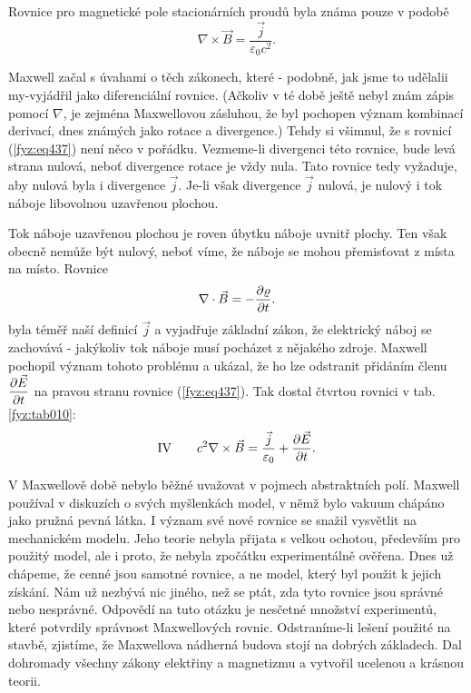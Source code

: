   Rovnice pro magnetické pole stacionárních proudů byla známa pouze v podobě
  \begin{equation}\label{fyz:eq437}
    \nabla\times\vec{B} = \dfrac{\vec{j}}{\varepsilon_0c^2}.
  \end{equation}
  
  Maxwell začal s úvahami o těch zákonech, které - podobně, jak jsme to udělalii my-vyjádřil jako 
  diferenciální rovnice. (Ačkoliv v té době ještě nebyl znám zápis pomocí \(\nabla\), je zejména 
  Maxwellovou zásluhou, že byl pochopen význam kombinací derivací, dnes známých jako rotace a 
  divergence.) Tehdy si všimnul, že s rovnicí (\ref{fyz:eq437}) není něco v pořádku. Vezmeme-li 
  divergenci této rovnice, bude levá strana nulová, neboť divergence rotace je vždy nula. Tato 
  rovnice tedy vyžaduje, aby nulová byla i divergence \(\vec{j}\). Je-li však divergence 
  \(\vec{j}\) nulová, je nulový i tok náboje libovolnou uzavřenou plochou. 
  
  Tok náboje uzavřenou plochou je roven úbytku náboje uvnitř plochy. Ten však obecně nemůže být 
  nulový, neboť víme, že náboje se mohou přemisťovat z místa na místo. Rovnice
  \begin{equation}\label{fyz:eq438}
    \nabla\cdot\vec{B} = -\dfrac{\partial \varrho}{\partial t}.
  \end{equation}
  byla téměř naší definicí \(\vec{j}\) a vyjadřuje základní zákon, že elektrický náboj se zachovává 
  - jakýkoliv tok náboje musí pocházet z nějakého zdroje. Maxwell pochopil význam tohoto problému a 
  ukázal, že ho lze odstranit přidáním členu \(\dfrac{\partial \vec{E}}{\partial t}\) na pravou stranu rovnice 
  (\ref{fyz:eq437}). Tak dostal čtvrtou rovnici v tab. \ref{fyz:tab010}:
  \begin{equation}\label{fyz:eq439}
    \text{IV}\qquad c^2\nabla\times\vec{B} = \frac{\vec{j}}{\varepsilon_0} + \dfrac{\partial \vec{E}}{\partial t}.
  \end{equation}
  
  V Maxwellově době nebylo běžné uvažovat v pojmech abstraktních polí. Maxwell používal v diskuzích 
  o svých myšlenkách model, v němž bylo vakuum chápáno jako pružná pevná látka. I význam své nové 
  rovnice se snažil vysvětlit na mechanickém modelu. Jeho teorie nebyla přijata s velkou ochotou, 
  především pro použitý model, ale i proto, že nebyla zpočátku experimentálně ověřena. Dnes už 
  chápeme, že cenné jsou samotné rovnice, a ne model, který byl použit k jejich získání. Nám už 
  nezbývá nic jiného, než se ptát, zda tyto rovnice jsou správné nebo nesprávné. Odpovědí na tuto 
  otázku je nesčetné množství experimentů, které potvrdily správnost Maxwellových rovnic. 
  Odstraníme-li lešení použité na stavbě, zjistíme, že Maxwellova nádherná budova stojí na dobrých 
  základech. Dal dohromady všechny zákony elektřiny a magnetizmu a vytvořil ucelenou a krásnou 
  teorii.
  
